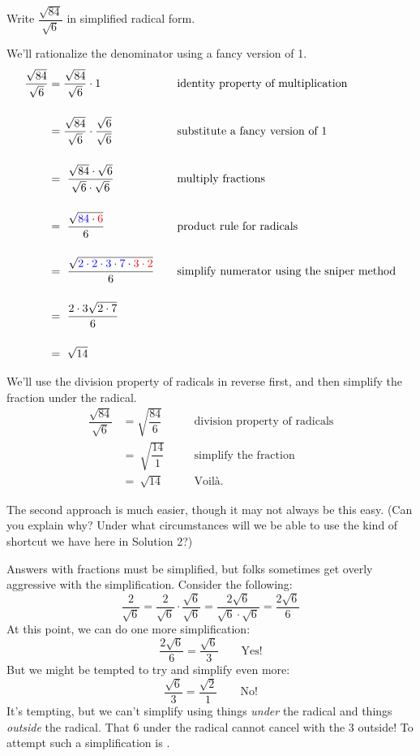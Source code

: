 \begin{boxedex}
Write $\dfrac{\sqrt{84}}{\sqrt{6}}$ in simplified radical form.

\bigskip{} We'll rationalize the denominator using a fancy version of 1.
\[\begin{aligned}
\dfrac{\sqrt{84}}{\sqrt{6}} &= \dfrac{\sqrt{84}}{\sqrt{6}} \cdot 1
&&\quad\text{identity property of multiplication}
\\[3ex]
&= \dfrac{\sqrt{84}}{\sqrt{6}} \cdot \dfrac{\sqrt{6}}{\sqrt{6}}
&&\quad\text{substitute a fancy version of 1}
\\[3ex]
&=~ \dfrac{\sqrt{84} \cdot \sqrt{6}}{\sqrt{6} \cdot \sqrt{6}}
&&\quad\text{multiply fractions}
\\[3ex]
&=~ \dfrac{\sqrt{{\color{blue}84} \cdot {\color{red}6}}}{6}
&&\quad\text{product rule for radicals}
\\[3ex]
&=~ \dfrac{\sqrt{{\color{blue}2 \cdot 2 \cdot 3 \cdot 7} \cdot {\color{red}3 \cdot 2}}}{6}
&&\quad\text{simplify numerator using the sniper method}
\\[3ex]
&=~ \dfrac{2 \cdot 3 \sqrt{2 \cdot 7}}{6}
&&\quad\text{}
\\[3ex]
&=~ \sqrt{14}
&&\quad\text{}\\
\end{aligned}
\]

\bigskip{} We'll use the division property of radicals in reverse first, and then simplify the fraction under the radical.
\[\begin{aligned}
\dfrac{\sqrt{84}}{\sqrt{6}} &= \sqrt{\dfrac{84}{6}}
&&\quad\text{division property of radicals}
\\[3ex]
&=~ \sqrt{\dfrac{14}{1}}
&&\quad\text{simplify the fraction}
\\[3ex]
&=~ \sqrt{14}
&&\quad\text{Voil\`a.}
\end{aligned}
\]
\end{boxedex}

The second approach is much easier, though it may not always be this easy. (Can you explain why? Under what circumstances will we be able to use the kind of shortcut we have here in Solution 2?)

\begin{boxedwarning}
Answers with fractions must be simplified, but folks sometimes get overly aggressive with the simplification. Consider the following: \[\frac{2}{\sqrt{6}} = \frac{2}{\sqrt{6}}\cdot\frac{\sqrt{6}}{\sqrt{6}} = \frac{2\sqrt{6}}{\sqrt{6}\cdot\sqrt{6}} = \frac{2\sqrt{6}}{6}\]
At this point, we can do one more simplification: \[\frac{2\sqrt{6}}{6} = \frac{\sqrt{6}}{3} \qquad \text{Yes!}\]
But we might be tempted to try and simplify even more: \[\frac{\sqrt{6}}{3} = \frac{\sqrt{2}}{1} \qquad \text{No!}\]
It's tempting, but we can't simplify using things \textit{under} the radical and things \textit{outside} the radical. That 6 under the radical cannot cancel with the 3 outside! To attempt such a simplification is \evilandwrong.
\end{boxedwarning}


